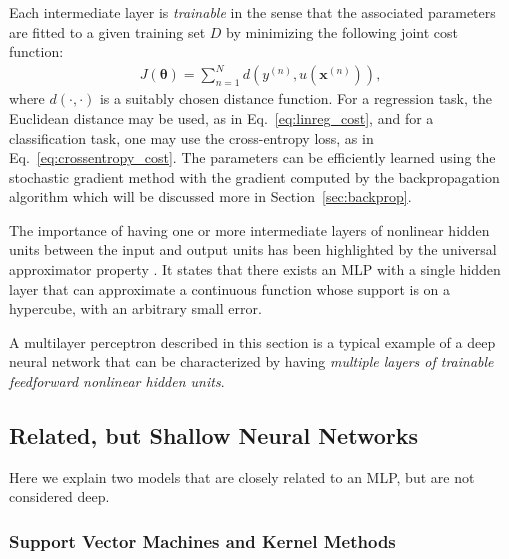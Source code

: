 \documentclass{now}
\newcommand{\vect}[1]{\mathbf{#1}}
\newcommand{\vects}[1]{\boldsymbol{#1}}
\newcommand{\vx}[0]{\vect{x}}
\newcommand{\TT}[0]{{\vects{\theta}}}
\begin{document}
Each intermediate layer is \textit{trainable} in the sense
that the associated parameters are fitted to a given
training set $D$ by minimizing the following joint cost
function:
\begin{align}
    \label{eq:mlp_cost}
    J(\TT) = \sum_{n=1}^N d\left(y^{(n)}, u(\vx^{(n)})\right),
\end{align}
where $d(\cdot, \cdot)$ is a suitably chosen distance
function. For a regression task, the Euclidean distance may be
used, as in Eq.~\eqref{eq:linreg_cost}, and for a
classification task, one may use the cross-entropy loss, as in
Eq.~\eqref{eq:crossentropy_cost}. The parameters can be
efficiently learned using the stochastic gradient method with the
gradient computed by the backpropagation algorithm
\citep{Rumelhart1986} which will be discussed more in
Section~\ref{sec:backprop}.

The importance of having one or more intermediate layers of
nonlinear hidden units between the input and output units has
been highlighted by the universal approximator property
\citep{Cybenko1989,Hornik1989}. It 
states that there exists an MLP with a single hidden layer that
can approximate a continuous function whose support is on a
hypercube, with an arbitrary small error.


A multilayer perceptron described in this section is a typical
example of a deep neural network that can be characterized by
having \textit{multiple layers of trainable feedforward nonlinear
hidden units}. 

\subsection{Related, but Shallow Neural Networks}

Here we explain two models that are closely related to an MLP,
but are not considered deep.

\subsubsection{Support Vector Machines and Kernel Methods}
\label{sec:svm}
\end{document}
